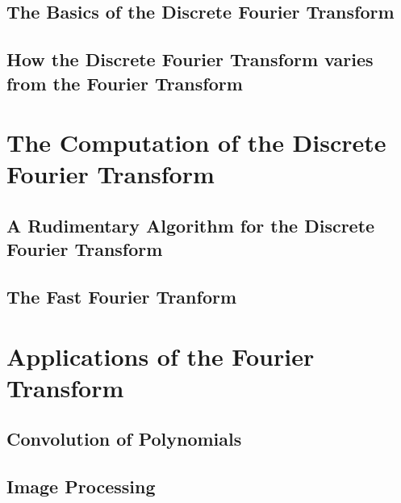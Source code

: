 \documentclass{amsproc}
\begin{document}
\subsection{The Basics of the Discrete Fourier Transform}

\subsection{How the Discrete Fourier Transform varies from the Fourier Transform}

\section{The Computation of the Discrete Fourier Transform}

\subsection{A Rudimentary Algorithm for the Discrete Fourier Transform}

\subsection{The Fast Fourier Tranform}

\section{Applications of the Fourier Transform}

\subsection{Convolution of Polynomials}

\subsection{Image Processing}
\end{document}
